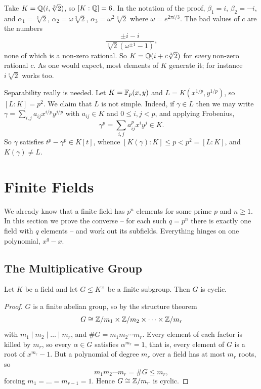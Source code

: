 \documentclass[a4paper]{scrartcl}
\begin{document}
\begin{example}
	Take $K = \mathbb{Q}(i, \sqrt[3]2)$, so $[K:\mathbb{Q}] = 6$. In the notation of the proof, $\beta_1 = i$, $\beta_2 = -i$, and $\alpha_1 = \sqrt[3]2$, $\alpha_2 = \omega\sqrt[3]2$, $\alpha_3 = \omega^2\sqrt[3]2$ where $\omega = e^{2\pi i /3}$. The bad values of $c$ are the numbers
	$$\frac{\pm i - i}{\sqrt[3]{2}(\omega^{\pm 1} - 1)},$$
	none of which is a non-zero rational. So $K = \mathbb{Q}(i + c\sqrt[3]2)$ for \emph{every} non-zero rational $c$. As one would expect, most elements of $K$ generate it; for instance $i\sqrt[3]2$ works too.
\end{example}

\begin{example}
	Separability really is needed. Let $K = \mathbb{F}_p(x,y)$ and $L = K(x^{1/p}, y^{1/p})$, so $[L:K] = p^2$. We claim that $L$ is not simple. Indeed, if $\gamma \in L$ then we may write $\gamma = \sum_{i,j} a_{ij}x^{i/p}y^{j/p}$ with $a_{ij} \in K$ and $0 \leq i,j < p$, and applying Frobenius,
	$$\gamma^p = \sum_{i,j} a_{ij}^p x^i y^j \in K.$$
	So $\gamma$ satisfies $t^p - \gamma^p \in K[t]$, whence $[K(\gamma):K] \leq p < p^2 = [L:K]$, and $K(\gamma) \neq L$.
\end{example}

\section{Finite Fields}

We already know that a finite field has $p^n$ elements for some prime $p$ and $n \geq 1$. In this section we prove the converse -- for each such $q = p^n$ there is exactly one field with $q$ elements -- and work out its subfields. Everything hinges on one polynomial, $x^q - x$.

\subsection{The Multiplicative Group}

\begin{proposition}\label{prop:cyclic}
	Let $K$ be a field and let $G \leq K^\times$ be a finite subgroup. Then $G$ is cyclic.
\end{proposition}

\begin{proof}
	$G$ is a finite abelian group, so by the structure theorem
	$$G \cong \mathbb{Z}/m_1 \times \mathbb{Z}/m_2 \times \dots \times \mathbb{Z}/m_r$$
	with $m_1 \mid m_2 \mid \dots \mid m_r$, and $\#G = m_1m_2\cdots m_r$. Every element of each factor is killed by $m_r$, so every $\alpha \in G$ satisfies $\alpha^{m_r} = 1$, that is, every element of $G$ is a root of $x^{m_r}-1$. But a polynomial of degree $m_r$ over a field has at most $m_r$ roots, so
	$$m_1m_2\cdots m_r = \#G \leq m_r,$$
	forcing $m_1 = \dots = m_{r-1} = 1$. Hence $G \cong \mathbb{Z}/m_r$ is cyclic.
\end{proof}
\end{document}
